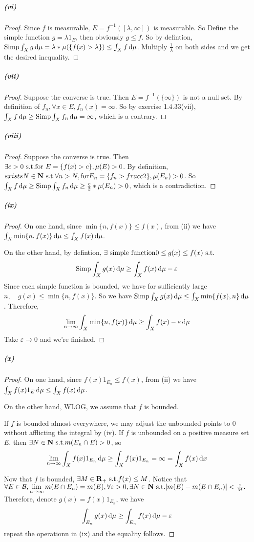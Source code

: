 \documentclass{article}
\begin{document}
\subparagraph{(vi)}
\begin{proof}
Since $f$ is measurable, $E=f^{-1}([\lambda,\infty])$ is measurable. So Define the simple function $g=\lambda1_{E}$, then obviously $g\leq f$. So by defintion, $\mathrm{Simp}\int_{X} g\,\mathrm{d} \mu=\lambda*\mu(\{f(x)>\lambda\})\leq \int_{X} f\,\mathrm{d} \mu$. Multiply $\frac 1 \lambda$ on both sides and we get the desired inequality.
\end{proof}
\subparagraph{(vii)}
\begin{proof}
Suppose the converse is true. Then $E=f^{-1}(\{\infty\})$ is not a null set. By definition of $f_n, \forall x\in E, f_n(x)=\infty$. So by exercise 1.4.33(vii), $\int_{X} f\,\mathrm{d} \mu\geq\mathrm{Simp}\int_{X} f_n\,\mathrm{d} \mu=\infty$, which is a contrary.
\end{proof}
\subparagraph{(viii)}
\begin{proof}
Suppose the converse is true. Then $\exists c>0\text{ s.t.} \text{for } E=\{f(x)>c\}, \mu(E)>0$. By definition, $exists N\in\mathbf{N}\text{ s.t.}\forall n>N, \text{for}E_n=\{f_n>frac c 2\},\mu(E_n)>0$. So $\int_{X} f\,\mathrm{d} \mu\geq \mathrm{Simp}\int_{X} f_n\,\mathrm{d} \mu\geq \frac c 2*\mu(E_n)>0$, which is a contradiction.
\end{proof}
\subparagraph{(ix)}
\begin{proof}
On one hand, since $\min\{n,f(x)\}\leq f(x)$, from (ii) we have $\int_{X}\min\{n,f(x)\}\,\mathrm{d} \mu\leq \int_{X}f(x)\,\mathrm{d} \mu$. 

On the other hand, by defintion, $\exists \text{ simple function} 0\leq g(x)\leq f(x)\text{ s.t.}$ 
\[\mathrm{Simp}\int_{X}g(x)\,\mathrm{d} \mu\geq \int_{X}f(x)\,\mathrm{d} \mu-\varepsilon\]
Since each simple function is bounded, we have for sufficiently large $n,\quad g(x)\leq \min\{n, f(x)\}$. So we have $\mathrm{Simp}\int_{X}g(x)\,\mathrm{d} \mu\leq \int_{X}\min\{f(x),n\}\,\mathrm{d} \mu$. Therefore,
\[\lim_{n\to\infty}\int_{X}\min\{n,f(x)\}\,\mathrm{d} \mu\geq \int_{X}f(x)-\varepsilon\,\mathrm{d} \mu\]
Take $\varepsilon\to 0$ and we're finished. 
\end{proof}
\subparagraph{(x)}
\begin{proof}
On one hand, since $f(x)1_{E_n}\leq f(x)$, from (ii) we have $\int_{X}f(x)1_{E}\,\mathrm{d} \mu\leq \int_{X}f(x)\,\mathrm{d} \mu$.

On the other hand, WLOG, we assume that $f$ is bounded.

If $f$ is bounded almost everywhere, we may adjust the unbounded points to 0 without afflicting the integral by (iv). If $f$ is unbounded on a positive measure set $E$, then $\exists N\in\mathbf{N}\text{ s.t.} m(E_n\cap E)>0$, so 
\[\lim_{n\to\infty}\int_{X}f(x)1_{E_n}\,\mathrm{d} \mu\geq \int_{X}f(x)1_{E_n}=\infty=\int_{X}f(x)\,\mathrm{d} x\]

Now that $f$ is bounded, $\exists M\in\mathbf{R}_+\text{ s.t.} f(x)\leq M$. Notice that $\forall E\in \mathcal{B},\lim\limits_{n\to\infty}m(E\cap E_n)=m(E), \forall \varepsilon >0,\exists N\in\mathbf{N}\text{ s.t.} |m(E)-m(E\cap E_n)|<\frac{\varepsilon}{M}.$ Therefore, denote $g(x)=f(x)1_{E_n}$, we have
\[\int_{E_n}g(x)\,\mathrm{d} \mu\geq \int_{E_n}f(x)\,\mathrm{d} \mu-\varepsilon\]
repeat the operationn in (ix) and the equality follows.
\end{proof}
\end{document}
